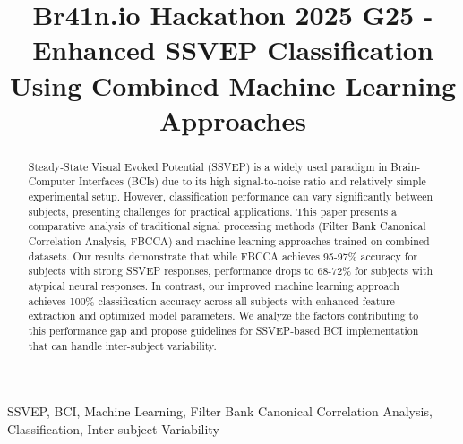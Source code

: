 \documentclass[conference]{IEEEtran}
\begin{document}
\title{Br41n.io Hackathon 2025 G25 - Enhanced SSVEP Classification Using Combined Machine Learning Approaches}

\author{
\and
{}
}

\maketitle

\begin{abstract}
Steady-State Visual Evoked Potential (SSVEP) is a widely used paradigm in Brain-Computer Interfaces (BCIs) due to its high signal-to-noise ratio and relatively simple experimental setup. However, classification performance can vary significantly between subjects, presenting challenges for practical applications. This paper presents a comparative analysis of traditional signal processing methods (Filter Bank Canonical Correlation Analysis, FBCCA) and machine learning approaches trained on combined datasets. Our results demonstrate that while FBCCA achieves 95-97\% accuracy for subjects with strong SSVEP responses, performance drops to 68-72\% for subjects with atypical neural responses. In contrast, our improved machine learning approach achieves 100\% classification accuracy across all subjects with enhanced feature extraction and optimized model parameters. We analyze the factors contributing to this performance gap and propose guidelines for SSVEP-based BCI implementation that can handle inter-subject variability.
\end{abstract}

\begin{IEEEkeywords}
SSVEP, BCI, Machine Learning, Filter Bank Canonical Correlation Analysis, Classification, Inter-subject Variability
\end{IEEEkeywords}
\end{document}
